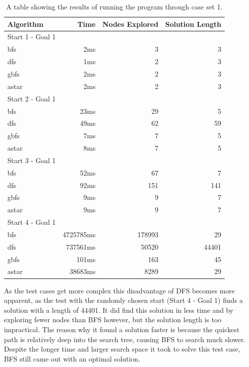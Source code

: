 \documentclass[12pt]{article}
\begin{document}
\begin{table}[h]
\centering
 	\begin{tabular}{l r r r}
   		Algorithm &     Time & Nodes Explored & Solution Length \\
   			\hline
   			Start 1 - Goal 1 \\
   			\hline
   		bfs & 2ms & 3 & 3 \\
   		dfs & 1ms & 2 & 3 \\
   		gbfs & 2ms & 2 & 3 \\
   		astar & 2ms & 2 & 3 \\
   		
   			\hline
   			Start 2 - Goal 1 \\
   			\hline
   		bfs & 23ms & 29 & 5 \\
   		dfs & 49ms & 62 & 59 \\
   		gbfs & 7ms & 7 & 5 \\
   		astar & 8ms & 7 & 5 \\	
   				
   			\hline
   			Start 3 - Goal 1 \\
   			\hline
   		bfs & 52ms & 67 & 7 \\
   		dfs & 92ms & 151 & 141 \\
   		gbfs & 9ms & 9 & 7 \\
   		astar & 9ms & 9 & 7 \\
   		
   			\hline
   			Start 4 - Goal 1 \\
   			\hline
   		bfs & 4725785ms & 178993 & 29 \\
   		dfs & 737561ms & 50520 & 44401 \\
   		gbfs & 101ms & 163 & 45 \\
   		astar & 38683ms & 8289 & 29 \\   		
  	\end{tabular}
  	
  	\caption{A table showing the results of running the program through case set 1.}
  	\label{tbl:DataSet1}
\end{table}

As the test cases get more complex this disadvantage of DFS becomes more apparent, as the test with the randomly chosen start (Start 4 - Goal 1) finds a solution with a length of 44401. It did find this solution in less time and by exploring fewer nodes than BFS however, but the solution length is too impractical. The reason why it found a solution faster is because the quickest path is relatively deep into the search tree, causing BFS to search much slower. Despite the longer time and larger search space it took to solve this test case, BFS still came out with an optimal solution. 
 
\end{document}
